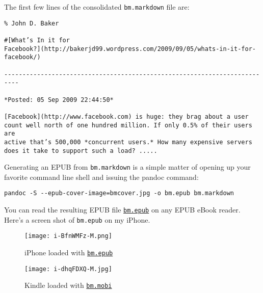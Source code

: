 \noindent The first few lines of the consolidated \texttt{bm.markdown} file are:

\begin{tcolorbox}[breakable, size=fbox, boxrule=1pt, pad at break*=1mm,colback=cellbackground, colframe=cellborder]
\begin{lstlisting}[language=jdoc,frame=single,framerule=0pt,label=lst:scr2587X1]
% Analyze the Data not the Drivel
% John D. Baker

#[What’s In it for
Facebook?](http://bakerjd99.wordpress.com/2009/09/05/whats-in-it-for-facebook/)

--------------------------------------------------------------------------

*Posted: 05 Sep 2009 22:44:50*

[Facebook](http://www.facebook.com) is huge: they brag about a user
count well north of one hundred million. If only 0.5% of their users are
active that’s 500,000 *concurrent users.* How many expensive servers
does it take to support such a load? .....
\end{lstlisting}
\end{tcolorbox}

\noindent Generating an EPUB from \texttt{bm.markdown} is a simple matter of
opening up your favorite command line shell and issuing the pandoc
command:
\begin{tcolorbox}[breakable, size=fbox, boxrule=1pt, pad at break*=1mm,colback=cellbackground, colframe=cellborder]
\begin{verbatim}
pandoc -S --epub-cover-image=bmcover.jpg -o bm.epub bm.markdown
\end{verbatim}
\end{tcolorbox}
You can read the resulting EPUB file \href{https://github.com/bakerjd99/Analyze-the-Data-not-the-Drivel/blob/master/wp2epub/bm.epub}{\texttt{bm.epub}} on any EPUB eBook
reader. Here's a screen shot of \texttt{bm.epub} on my iPhone.

\captionsetup[figure]{labelformat=empty}
\begin{figure}[ht]
\begin{minipage}[b]{0.48\textwidth}
\centering
\texttt{[image: i-BfnWMFz-M.png]}
\caption{iPhone loaded with \href{https://github.com/bakerjd99/Analyze-the-Data-not-the-Drivel/blob/master/wp2epub/bm.epub}{\texttt{bm.epub}}}
\label{fig:2587X0}
\end{minipage}
\hspace{1pt}
\begin{minipage}[b]{0.48\textwidth}
\centering
\texttt{[image: i-dhqFDXQ-M.jpg]}
\caption{Kindle loaded with \href{https://github.com/bakerjd99/Analyze-the-Data-not-the-Drivel/blob/master/wp2epub/bm.mobi}{\texttt{bm.mobi}}}
\label{fig:2587X1}
\end{minipage}
\end{figure}


